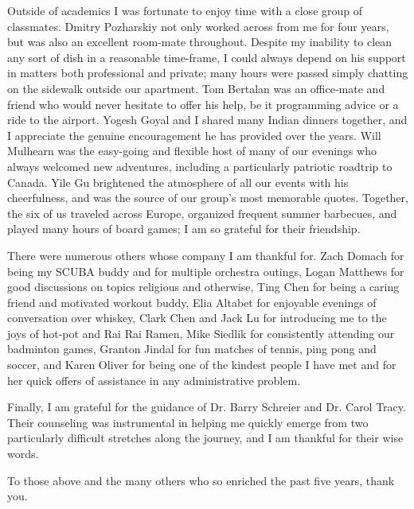 Outside of academics I was fortunate to enjoy time with a close group of classmates. Dmitry Pozharskiy not only worked across from me for four years, but was also an excellent room-mate throughout. Despite my inability to clean any sort of dish in a reasonable time-frame, I could always depend on his support in matters both professional and private; many hours were passed simply chatting on the sidewalk outside our apartment. Tom Bertalan was an office-mate and friend who would never hesitate to offer his help, be it programming advice or a ride to the airport. Yogesh Goyal and I shared many Indian dinners together, and I appreciate the genuine encouragement he has provided over the years. Will Mulhearn was the easy-going and flexible host of many of our evenings who always welcomed new adventures, including a particularly patriotic roadtrip to Canada. Yile Gu brightened the atmosphere of all our events with his cheerfulness, and was the source of our group's most memorable quotes. Together, the six of us traveled across Europe, organized frequent summer barbecues, and played many hours of board games; I am so grateful for their friendship.

There were numerous others whose company I am thankful for. Zach Domach for being my SCUBA buddy and for multiple orchestra outings, Logan Matthews for good discussions on topics religious and otherwise, Ting Chen for being a caring friend and motivated workout buddy, Elia Altabet for enjoyable evenings of conversation over whiskey, Clark Chen and Jack Lu for introducing me to the joys of hot-pot and Rai Rai Ramen, Mike Siedlik for consistently attending our badminton games, Granton Jindal for fun matches of tennis, ping pong and soccer, and Karen Oliver for being one of the kindest people I have met and for her quick offers of assistance in any administrative problem.

Finally, I am grateful for the guidance of Dr. Barry Schreier and Dr. Carol Tracy. Their counseling was instrumental in helping me quickly emerge from two particularly difficult stretches along the journey, and I am thankful for their wise words.

To those above and the many others who so enriched the past five years, thank you.